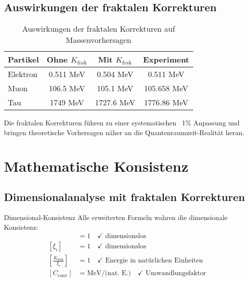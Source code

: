 \documentclass[12pt,a4paper]{article}
\begin{document}
\subsection{Auswirkungen der fraktalen Korrekturen}
\label{subsec:fractal_impact}

\begin{table}[H]
	\centering
	\begin{tabular}{lccc}
		\toprule
		\textbf{Partikel} & \textbf{Ohne $K_{\text{frak}}$} & \textbf{Mit $K_{\text{frak}}$} & \textbf{Experiment} \\
		\midrule
		Elektron & 0.511 MeV & 0.504 MeV & 0.511 MeV \\
		Muon & 106.5 MeV & 105.1 MeV & 105.658 MeV \\
		Tau & 1749 MeV & 1727.6 MeV & 1776.86 MeV \\
		\bottomrule
	\end{tabular}
	\caption{Auswirkungen der fraktalen Korrekturen auf Massenvorhersagen}
	\label{tab:fractal_impact}
\end{table}

Die fraktalen Korrekturen f\"u{}hren zu einer systematischen ~1\% Anpassung und bringen theoretische Vorhersagen n\"a{}her an die Quantenraumzeit-Realit\"a{}t heran.

\section{Mathematische Konsistenz}
\label{sec:mathematical_consistency}

\subsection{Dimensionalanalyse mit fraktalen Korrekturen}
\label{subsec:dimensional_analysis}

\begin{wichtig}{Dimensional-Konsistenz}{}
	Alle erweiterten Formeln wahren die dimensionale Konsistenz:
	\begin{align}
		[K_{\text{frak}}] &= 1 \quad \checkmark \text{ dimensionslos} \\
		[\xi_i] &= 1 \quad \checkmark \text{ dimensionslos} \\
		\left[\frac{K_{\text{frak}}}{\xi_i}\right] &= 1 \quad \checkmark \text{ Energie in nat\"u{}rlichen Einheiten} \\
		[C_{\text{conv}}] &= \text{MeV/(nat. E.)} \quad \checkmark \text{ Umwandlungsfaktor}
	\end{align}
\end{wichtig}
\end{document}

